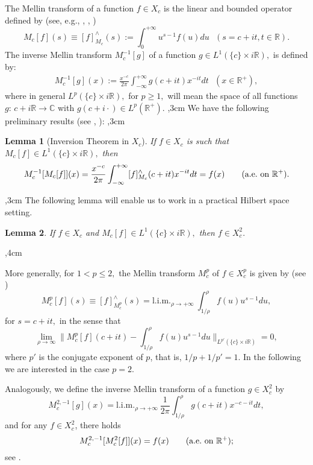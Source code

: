 \documentclass[amsmath,english,a4paper,graphicx,12pt]{article}
\begin{document}
The Mellin transform of a function $f\in X_c$ is the linear and bounded operator defined by (see, e.g., \cite{MA}, \cite{GPS},  \cite{BJ2})
$$ M_c[f](s) \equiv [f]^{\wedge}_{M_c} (s) := \int_0^{+\infty} u^{s-1} f(u) du~~~(s=c+ it, t\in \mathbb{R}).$$
The inverse Mellin transform $M^{-1}_c[g]$ of a function $g \in L^1(\{c\} \times i \mathbb{R}),$ is defined by:
\begin{eqnarray*}
M^{-1}_c[g](x)  :=
 \frac{x^{-c}}{2 \pi}\int_{-\infty}^{+\infty} g(c+it) x^{-it}dt ~~~(x \in \mathbb{R}^+),
\end{eqnarray*}
where  in general $L^p(\{c\} \times i \mathbb{R}),$ for $p \geq 1,$ will mean the space of all functions 
$g:\, c+i \mathbb{R} \rightarrow \mathbb{C}$ with 
$g(c +i\cdot) \in L^p(\mathbb{R}^+).$
,3cm
We have the following preliminary results (see \cite{BJ2}, \cite{BBM1}):
,3cm
\newtheorem{Lemma}{Lemma}
\begin{Lemma}[Inversion Theorem in $X_c$] \label{inversion}
If $f \in X_c$ is such that $M_c[f] \in L^1(\{c\} \times i \mathbb{R}),$ then 
$$M_c^{-1}[M_c[f]](x) = \frac{x^{-c}}{2 \pi} \int_{-\infty}^{+\infty} [f]^\wedge_{M_c}(c+it)x^{-it}dt = f(x) \quad \quad (\hbox{a.e.\ on } \mathbb{R}^+).$$
\end{Lemma}
,3cm
\noindent
 The following lemma will enable us to work  in a practical Hilbert space setting.
\begin{Lemma}\label{inclusion}
 If $f \in X_c$  and $M_c[f] \in L^1(\{c\} \times i \mathbb{R}),$ then 
$f \in X^2_c.$ 
\end{Lemma}
,4cm

More generally, for $1<p \leq 2,$  the Mellin transform $M_c^p$ of $f \in X^p_c$ is given by (see \cite{BJ4})
$$M_c^p[f](s) \equiv [f]^{\wedge}_{M_c^p} (s) = \mbox{l.i.m.}_{\rho \rightarrow +\infty}~\int_{1/\rho}^\rho f(u) u^{s-1}du,$$
for $s=c+it,$ 
in the sense that
$$\lim_{\rho \rightarrow \infty}\bigg\|M_c^p[f](c+it) - \int_{1/\rho}^\rho f(u) u^{s-1}du\bigg\|_{L^{p'}(\{c\}\times i \mathbb{R})} = 0,$$
where $p'$ is the conjugate exponent of $p$, that is, $1/p + 1/p'=1$.
In the following we are interested in the case $p=2.$ 

Analogously, we define the inverse Mellin transform of a function $g \in X^2_c$ by 
$$M^{2, -1}_c[g](x) = \mbox{l.i.m.}_{\rho \rightarrow +\infty}~\frac{1}{2 \pi}\int_{1/\rho}^\rho g(c+it) x^{-c-it}dt,$$
and for any $f \in X^2_c$, there holds
$$M^{2, -1}_c[M_c^2[f]](x) = f(x)\quad \quad (\hbox{a.e.\ on } \mathbb{R}^+);$$
see \cite{BJ4}.
\end{document}
